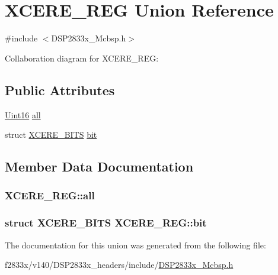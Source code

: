 \hypertarget{union_x_c_e_r_e___r_e_g}{}\section{X\+C\+E\+R\+E\+\_\+\+R\+E\+G Union Reference}
\label{union_x_c_e_r_e___r_e_g}


{\ttfamily \#include $<$D\+S\+P2833x\+\_\+\+Mcbsp.\+h$>$}



Collaboration diagram for X\+C\+E\+R\+E\+\_\+\+R\+E\+G\+:
\subsection*{Public Attributes}
\begin{DoxyCompactItemize}
\item 
\hyperlink{_d_s_p2833x___device_8h_a59a9f6be4562c327cbfb4f7e8e18f08b}{Uint16} \hyperlink{union_x_c_e_r_e___r_e_g_ab35e970bc8815c967a7afdc3835696a8}{all}
\item 
struct \hyperlink{struct_x_c_e_r_e___b_i_t_s}{X\+C\+E\+R\+E\+\_\+\+B\+I\+T\+S} \hyperlink{union_x_c_e_r_e___r_e_g_acfbe27f7d1097f4298973932aa9e897a}{bit}
\end{DoxyCompactItemize}


\subsection{Member Data Documentation}
\hypertarget{union_x_c_e_r_e___r_e_g_ab35e970bc8815c967a7afdc3835696a8}{}
\subsubsection[{all}]{ X\+C\+E\+R\+E\+\_\+\+R\+E\+G\+::all}\label{union_x_c_e_r_e___r_e_g_ab35e970bc8815c967a7afdc3835696a8}
\hypertarget{union_x_c_e_r_e___r_e_g_acfbe27f7d1097f4298973932aa9e897a}{}
\subsubsection[{bit}]{\setlength{\rightskip}{0pt plus 5cm}struct {\bf X\+C\+E\+R\+E\+\_\+\+B\+I\+T\+S} X\+C\+E\+R\+E\+\_\+\+R\+E\+G\+::bit}\label{union_x_c_e_r_e___r_e_g_acfbe27f7d1097f4298973932aa9e897a}


The documentation for this union was generated from the following file\+:\begin{DoxyCompactItemize}
\item 
f2833x/v140/\+D\+S\+P2833x\+\_\+headers/include/\hyperlink{_d_s_p2833x___mcbsp_8h}{D\+S\+P2833x\+\_\+\+Mcbsp.\+h}\end{DoxyCompactItemize}
